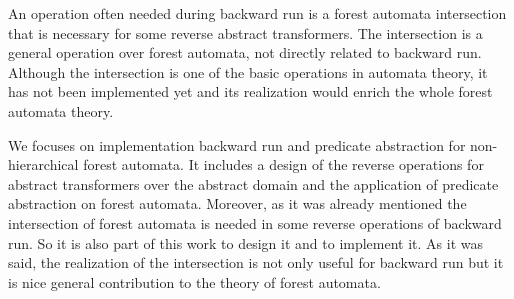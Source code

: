 \documentclass[fleqn,11pt]{ExcelAtFIT} %
\begin{document}
An operation often needed during backward run is a forest automata intersection
that is necessary for some reverse abstract transformers.
The intersection is a general operation over forest automata,
not directly related to backward run.
Although the intersection is one of the basic operations in automata theory,
it has not been implemented yet and its realization would enrich the whole forest automata theory.
\begin{comment}
The intersection is sometimes needed to be done during a backward run between a forest automaton from forward run
and the~last forest automaton from backward run.
The~resulting forest automaton is then further used in backward run after an application
of the corresponding reverse abstract transformer.
This is illustrated by Figure~\ref{fig:bwrun}.
Consider an oval representing the language $L(X_{k+1})$ which is the language
of a forest automaton in the backward run and an abstract transformer $\beta$ such that $\beta(L(M^{\alpha}_{k})) = L(M_{k+1})$.
The next state in backward run with the forest automaton language $L(X_{k})$ is obtained
by an application of the reverse abstract transformer $\beta^{-1}$ (illustrated by the doted lines) on the intersection
(represented by the red and the orange area) of the language $L(X_{k+1})$ from backward run 
and the language $L(M^{\alpha}_{k+1})$ from forward run.
It is not necessary to do the intersection before each reverse abstract transformer in Forester
but it is needed for a few of them.
\end{comment}

We focuses on implementation backward run and predicate abstraction
for non-hierarchical forest automata.
It includes a design of the reverse operations for abstract transformers over
the abstract domain and the application of predicate abstraction on forest automata.
Moreover, as it was already mentioned the intersection of forest automata is needed in some reverse
operations of backward run.
So it is also part of this work to design it and to implement it.
As it was said, the realization of the intersection is not only useful for backward run but
it is nice general contribution to the theory of forest automata.

\begin{comment}
We mentioned that this work implements either backward run and predicate abstraction only for
non-hierarchical forest automata.
Such extension for hierarchical forest automata is definitely a challenging issue for future work
that will be done next after finishing the implementation of basic predicate abstraction.
\end{comment}
\end{document}
